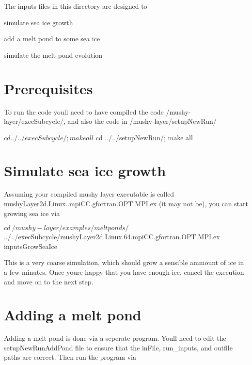 The inputs files in this directory are designed to


\begin{DoxyEnumerate}
\item simulate sea ice growth
\item add a melt pond to some sea ice
\item simulate the melt pond evolution
\end{DoxyEnumerate}

\section*{Prerequisites}

To run the code you\textquotesingle{}ll need to have compiled the code {\ttfamily /mushy-\/layer/exec\+Subcycle/}, and also the code in {\ttfamily /mushy-\/layer/setup\+New\+Run/}


\begin{DoxyCode}
$ cd ../../execSubcycle/; make all
$ cd ../../setupNewRun/; make all
\end{DoxyCode}


\section*{Simulate sea ice growth}

Assuming your compiled mushy layer executable is called {\ttfamily mushy\+Layer2d.\+Linux..\+mpi\+C\+C.\+gfortran.\+O\+P\+T.\+M\+P\+I.\+ex} (it may not be), you can start growing sea ice via


\begin{DoxyCode}
$ cd ~/mushy-layer/examples/meltponds/
$ ../../execSubcycle/mushyLayer2d.Linux.64.mpiCC.gfortran.OPT.MPI.ex  inputsGrowSeaIce
\end{DoxyCode}


This is a very coarse simulation, which should grow a sensible ammount of ice in a few minutes. Once you\textquotesingle{}re happy that you have enough ice, cancel the execution and move on to the next step.

\section*{Adding a melt pond}

Adding a melt pond is done via a seperate program. You\textquotesingle{}ll need to edit the {\ttfamily setup\+New\+Run\+Add\+Pond} file to ensure that the {\ttfamily in\+File}, {\ttfamily run\+\_\+inputs}, and {\ttfamily outfile} paths are correct. Then run the program via


